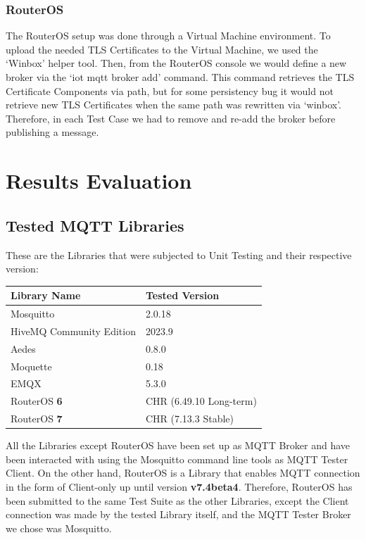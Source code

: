 \documentclass[binding=0.6cm,noexaminfo]{sapthesis}
\begin{document}
\subsection{RouterOS}
The RouterOS setup was done through a Virtual Machine environment. To upload the needed TLS Certificates to the Virtual Machine, we used the `Winbox' helper tool. Then, from the RouterOS console we would define a new broker via the `iot mqtt broker add' command. This command retrieves the TLS Certificate Components via path, but for some persistency bug it would not retrieve new TLS Certificates when the same path was rewritten via `winbox'. Therefore, in each Test Case we had to remove and re-add the broker before publishing a message.

\chapter{Results Evaluation}
\section{Tested MQTT Libraries}
These are the Libraries that were subjected to Unit Testing and their respective version:

\begin{center}
\begin{tabular}{| p{6cm} | p{6cm} |}
\hline
\textbf{Library Name} & \textbf{Tested Version} \\
\hline
Mosquitto & 2.0.18 \\
\hline
HiveMQ Community Edition & 2023.9 \\
\hline
Aedes & 0.8.0 \\
\hline
Moquette & 0.18 \\
\hline
EMQX & 5.3.0 \\
\hline
RouterOS \textbf{6} & CHR (6.49.10 Long-term) \\
\hline
RouterOS \textbf{7} & CHR (7.13.3 Stable) \\
\hline
\end{tabular}
\end{center}

All the Libraries except RouterOS have been set up as MQTT Broker and have been interacted with using the Mosquitto command line tools as MQTT Tester Client. On the other hand, RouterOS is a Library that enables MQTT connection in the form of Client-only up until version \textbf{v7.4beta4}. Therefore, RouterOS has been submitted to the same Test Suite as the other Libraries, except the Client connection was made by the tested Library itself, and the MQTT Tester Broker we chose was Mosquitto.
\end{document}
